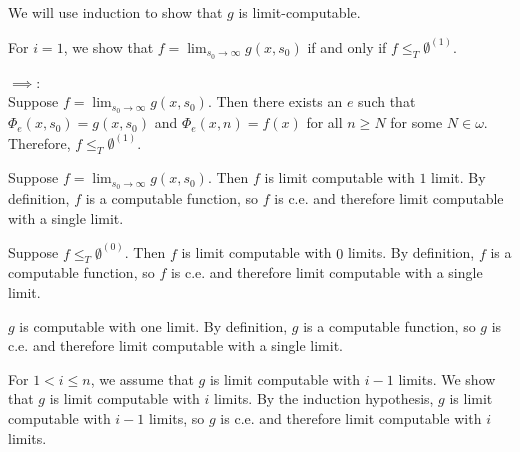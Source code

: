 \begin{problem}
\begin{answer}


    We will use induction to show that $g$ is limit-computable.

    \begin{enumarabic}
      \item For $i = 1$, we show that $\displaystyle f = \lim_{s_0 \to \infty} g(x, s_0)$
        if and only if $f \leq_T \emptyset^{(1)}$.
        \begin{enumroman}
          \item $\implies$: \\
            Suppose $\displaystyle f = \lim_{s_0 \to \infty} g(x, s_0)$.
            Then there exists an $e$ such that $\Phi_e(x, s_0) = g(x, s_0)$
            and $\Phi_e(x, n) = f(x)$ for all $n \geq N$ for some $N \in \omega$.
            Therefore, $f \leq_T \emptyset^{(1)}$.
          \item Suppose $\displaystyle f = \lim_{s_0 \to \infty} g(x, s_0)$.
            Then $f$ is limit computable with $1$ limit.
            By definition, $f$ is a computable function, so $f$ is c.e.
            and therefore limit computable with a single limit.
          \item Suppose $f \leq_T \emptyset^{(0)}$.
            Then $f$ is limit computable with $0$ limits.
            By definition, $f$ is a computable function, so $f$ is c.e.
            and therefore limit computable with a single limit.
        \end{enumroman}
      
      $g$ is computable with one limit.
        By definition, $g$ is a computable function, so $g$ is c.e.
        and therefore limit computable with a single limit.
      \item For $1 < i \leq n$, we assume that $g$ is limit computable with $i-1$ limits.
        We show that $g$ is limit computable with $i$ limits.
        By the induction hypothesis, $g$ is limit computable with $i-1$ limits,
        so $g$ is c.e. and therefore limit computable with $i$ limits.
    \end{enumarabic}
  \end{answer}
\end{problem}
